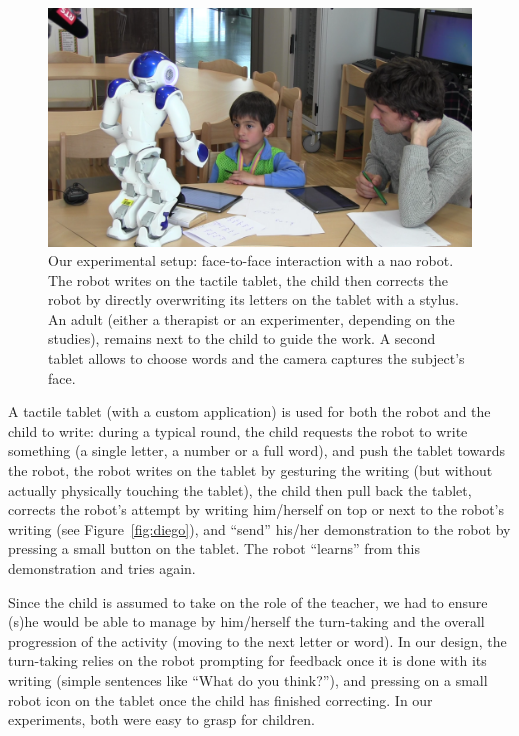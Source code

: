 \documentclass{sig-alternate}
\begin{document}
\begin{figure}
    \centering
    \includegraphics[width=1\columnwidth]{realSetup}
    \caption{\small Our experimental setup: face-to-face interaction with a {\sc
            nao} robot.  The robot writes on the tactile tablet, the child then
            corrects the robot by directly overwriting its letters on the tablet
            with a stylus. An adult (either a therapist or an experimenter,
            depending on the studies), remains next to the child to guide the work. 
            A second tablet allows to choose words and the camera captures the subject's face.}
    \label{realSetup}
\end{figure}

A tactile tablet (with a custom application) is used for both the robot and the
child to write: during a typical round, the child requests the robot to write
something (a single letter, a number or a full word), and push the tablet
towards the robot, the robot writes on the tablet by gesturing the writing (but
without actually physically touching the tablet), the child then pull back the
tablet, corrects the robot's attempt by writing him/herself on top or next to
the robot's writing (see Figure~\ref{fig:diego}), and ``send'' his/her
demonstration to the robot by pressing a small button on the tablet. The robot
``learns'' from this demonstration and tries again.

Since the child is assumed to take on the role of the teacher, we had to ensure
(s)he would be able to manage by him/herself the turn-taking and the overall
progression of the activity (moving to the next letter or word). In our design,
the turn-taking relies on the robot prompting for feedback once it is done with
its writing (simple sentences like ``What do you think?''), and pressing on a
small robot icon on the tablet once the child has finished correcting. In our
experiments, both were easy to grasp for children.
\end{document}
